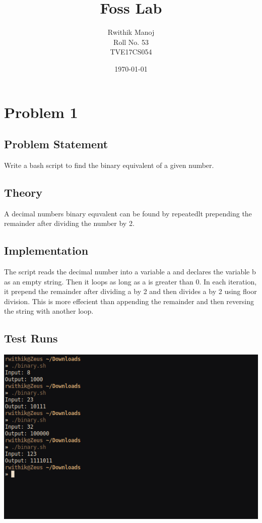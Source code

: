 \documentclass[10pt,a4paper,titlepage]{report}
\begin{document}
\begin{titlepage}
		\author{Rwithik Manoj\\Roll No. 53\\TVE17CS054}
\title{Foss Lab}
\date{\today}
\maketitle
\end{titlepage}

\chapter*{Problem 1}

\section*{Problem Statement}

Write a bash script to find the binary equivalent of a given number.

\section*{Theory}

A decimal numbers binary equvalent can be found by repeatedlt prepending the remainder after dividing the number by 2. 

\section*{Implementation}

The script reads the decimal number into a variable a and declares the variable b as an empty string. Then it loops as long as a is greater than 0. In each iteration, it prepend the remainder after dividing a by 2 and then divides a by 2 using floor division. This is more effecient than appending the remainder and then reversing the string with another loop. 

\section*{Test Runs}

\includegraphics[width=\linewidth]{../Images/ExamReport/binary.png}
\end{document}
